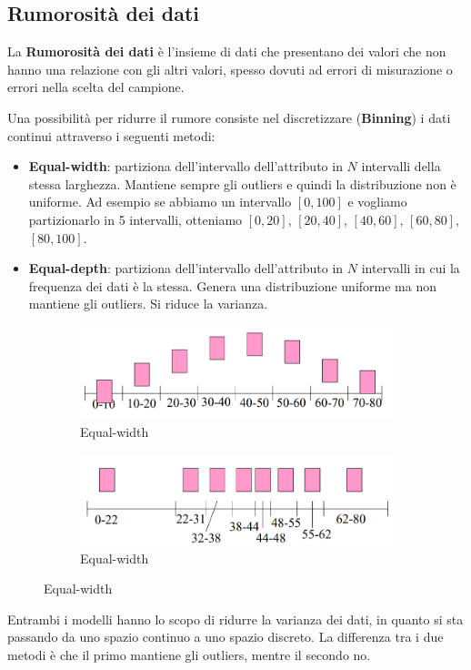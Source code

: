 \subsection{Rumorosità dei dati}
\begin{definizione} 
      La \textbf{Rumorosità dei dati} è l'insieme di dati che presentano dei
      valori che non hanno una relazione con gli altri valori, spesso dovuti ad
      errori di misurazione o errori nella scelta del campione.
\end{definizione}
Una possibilità per ridurre il rumore consiste nel discretizzare (\textbf{Binning})
i dati continui attraverso i seguenti metodi:
\begin{itemize}
      \item \textbf{Equal-width}: partiziona dell'intervallo dell'attributo in $N$
            intervalli della stessa larghezza. Mantiene sempre gli outliers e
            quindi la distribuzione non è uniforme.
            Ad esempio se abbiamo un intervallo $[0, 100]$ e vogliamo partizionarlo
            in 5 intervalli, otteniamo $[0, 20]$, $[20, 40]$, $[40, 60]$, $[60, 80]$,
            $[80, 100]$.
      \item \textbf{Equal-depth}: partiziona dell'intervallo dell'attributo in $N$
            intervalli in cui la frequenza dei dati è la stessa. Genera una
            distribuzione uniforme ma non mantiene gli outliers. Si riduce la
            varianza.
\end{itemize}
\begin{figure}[!ht]
      \begin{subfigure}[b]{0.45\textwidth}
            \centering
            \includegraphics[width=\textwidth]{./img/Preprocessing/equalwidth.png}
            \caption{Equal-width}
            \label{fig:equal-width}
      \end{subfigure}
      \hfill
      \begin{subfigure}[b]{0.45\textwidth}
            \centering
            \includegraphics[width=\textwidth]{./img/Preprocessing/equaldepth.png}
            \caption{Equal-width}
            \label{fig:equal-depth}
      \end{subfigure}
\end{figure}
Entrambi i modelli hanno lo scopo di ridurre la varianza dei dati, in quanto si
sta passando da uno spazio continuo a uno spazio discreto. La differenza tra i
due metodi è che il primo mantiene gli outliers, mentre il secondo no.
